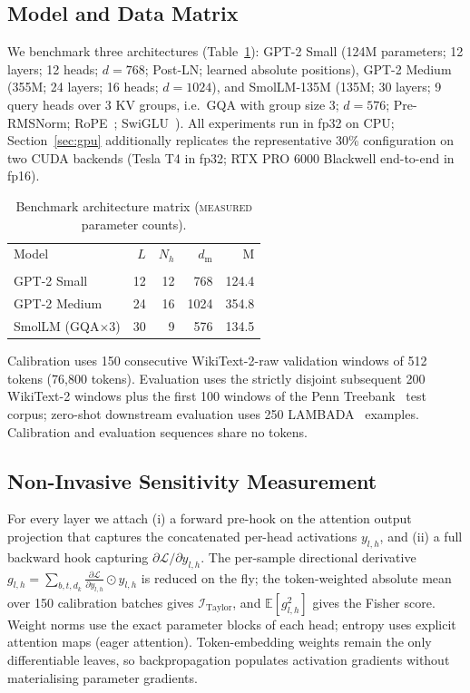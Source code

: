 \documentclass[11pt]{article}
\begin{document}
\subsection{Model and Data Matrix}
We benchmark three architectures (Table~\ref{tab:arch}): GPT-2 Small
(124M parameters; 12 layers; 12 heads; $d=768$; Post-LN; learned absolute
positions), GPT-2 Medium (355M; 24 layers; 16 heads; $d=1024$), and
SmolLM-135M (135M; 30 layers; 9 query heads over 3 KV groups, i.e.\ GQA with
group size 3; $d=576$; Pre-RMSNorm; RoPE~\cite{su2024roformer}; SwiGLU~\cite{shazeer2020glu}).
All experiments run in fp32 on CPU; Section~\ref{sec:gpu}
additionally replicates the representative 30\% configuration on two CUDA
backends (Tesla T4 in fp32; RTX PRO 6000 Blackwell end-to-end in fp16).

\begin{table}[!t]
\caption{Benchmark architecture matrix (\textsc{measured} parameter counts).}
\label{tab:arch}
\centering
\footnotesize
\scriptsize
\begin{tabular}{lrrrr}
\toprule
Model & $L$ & $N_h$ & $d_{\text{m}}$ & M\\ \\
\midrule
GPT-2 Small & 12 & 12 & 768 & 124.4 \\
GPT-2 Medium & 24 & 16 & 1024 & 354.8 \\
SmolLM (GQA$\times$3) & 30 & 9 & 576 & 134.5 \\
\bottomrule
\end{tabular}
\end{table}

Calibration uses 150 consecutive WikiText-2-raw validation windows of 512 tokens
(76{,}800 tokens). Evaluation uses the strictly disjoint subsequent 200
WikiText-2 windows plus the first 100 windows of the Penn
Treebank~\cite{marcus1994penn,merity2016pointer} test corpus; zero-shot
downstream evaluation uses 250 LAMBADA~\cite{paperno2016lambada} examples.
Calibration and evaluation sequences share no tokens.

\subsection{Non-Invasive Sensitivity Measurement}
For every layer we attach (i) a forward pre-hook on the attention output
projection that captures the concatenated per-head activations
$y_{l,h}$, and (ii) a full backward hook capturing
$\partial\mathcal{L}/\partial y_{l,h}$. The per-sample directional derivative
$g_{l,h}=\sum_{b,t,d_k}\frac{\partial\mathcal{L}}{\partial y_{l,h}}\odot y_{l,h}$ is
reduced on the fly; the token-weighted absolute mean over 150 calibration batches
gives $\mathcal{I}_{\text{Taylor}}$, and $\mathbb{E}[g^2_{l,h}]$ gives the Fisher
score. Weight norms use the exact parameter blocks of each head; entropy uses
explicit attention maps (eager attention). Token-embedding weights remain the only
differentiable leaves, so backpropagation populates activation gradients without
materialising parameter gradients.
\end{document}
